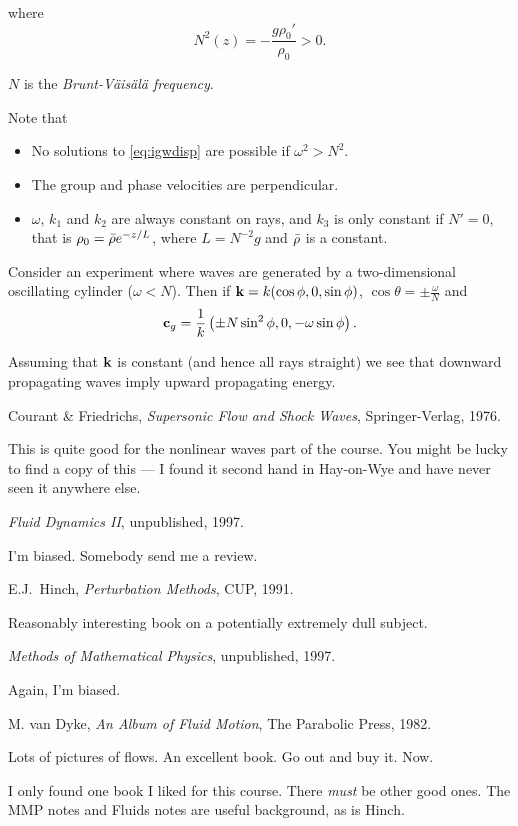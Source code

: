 \documentclass{notes}
\newcommand{\vk}{\vect{k}}
\begin{document}
where
\[
N^2(z) = - \frac{g \rho_0'}{\rho_0} > 0.
\]

$N$ is the \emph{Brunt-V\"ais\"al\"a frequency}.

Note that

\begin{itemize}
\item No solutions to \eqref{eq:igwdisp} are possible if $\omega^2 > N^2$.
\item The group and phase velocities are perpendicular.
\item $\omega$, $k_1$ and $k_2$ are always constant on rays, and $k_3$
  is only constant if $N' = 0$, that is $\rho_0 = \Bar{\rho}
  e^{-z/L}$, where $L = N^{-2}g$ and $\Bar{\rho}$ is a constant.
\end{itemize}

Consider an experiment where waves are generated by a two-dimensional
oscillating cylinder ($\omega < N$).  Then if $\vk = k(\cos \phi,0,\sin
\phi)$, $\cos \theta = \pm \tfrac{\omega}{N}$ and
\[
\mathbf{c}_g = \frac{1}{k} \left( \pm N \sin^2 \phi,0,-\omega \sin \phi\right).
\]

Assuming that $\vk$ is constant (and hence all rays straight) we see
that downward propagating waves imply upward propagating energy.

\backmatter

\begin{thebibliography}{9}

 Courant \& Friedrichs, \emph{Supersonic Flow and
    Shock Waves}, Springer-Verlag, 1976.

  {\sffamily \small This is quite good for the nonlinear waves part of
  the course.  You might be lucky to find a copy of this --- I found
  it second hand in Hay-on-Wye and have never seen it anywhere else.}

 \emph{Fluid Dynamics II}, unpublished, 1997.
  
  {\sffamily \small I'm biased. Somebody send me a review.}

 E.J.~Hinch, \emph{Perturbation Methods}, CUP, 1991.
  
  {\sffamily \small Reasonably interesting book on a potentially
    extremely dull subject.}

 \emph{Methods of Mathematical Physics},
  unpublished, 1997.

  {\sffamily \small Again, I'm biased.}

 M. van Dyke, \emph{An Album of Fluid Motion}, The
  Parabolic Press, 1982.
  
  {\sffamily \small Lots of pictures of flows.  An excellent book.  Go
    out and buy it.  Now.}

\end{thebibliography}

I only found one book I liked for this course.  There \emph{must} be
other good ones.  The MMP notes and Fluids notes are useful
background, as is Hinch.
\end{document}
